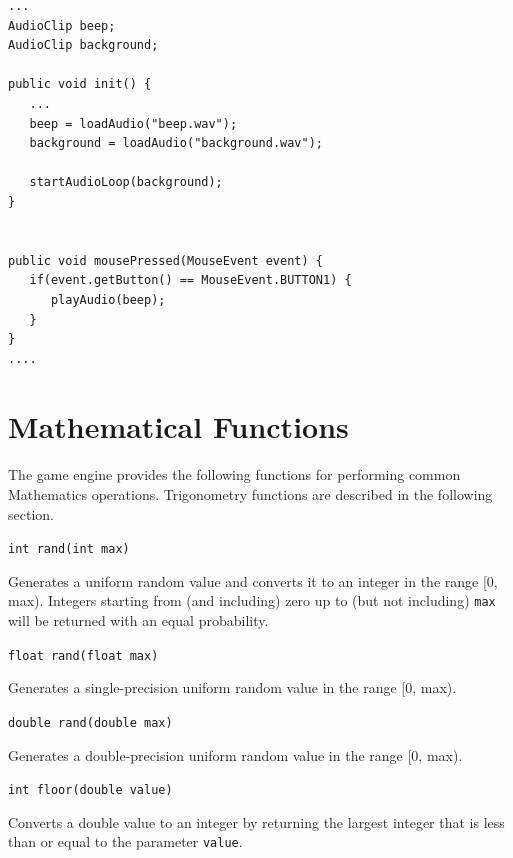 \documentclass[a4paper, 10pt]{report}
\begin{document}
\vspace{1em}
\begin{lstlisting}[caption=Example use game engine audio functions., label=lst:audio]
...
AudioClip beep;
AudioClip background;

public void init() {
   ...
   beep = loadAudio("beep.wav");
   background = loadAudio("background.wav");
   
   startAudioLoop(background);
}


public void mousePressed(MouseEvent event) {
   if(event.getButton() == MouseEvent.BUTTON1) {
      playAudio(beep);
   }
}
....
\end{lstlisting}


\vspace{1em}

\section{Mathematical Functions}

The game engine provides the following functions for performing common Mathematics operations. Trigonometry functions are described in the following section.

\hrulefill

{\large {\tt int rand(int max)}}

Generates a uniform random value and converts it to an integer in the range [0, max). Integers starting from (and including) zero up to (but not including) {\tt max} will be returned with an equal probability.

\hrulefill

{\large {\tt float rand(float max)}}

Generates a single-precision uniform random value in the range [0, max).

\hrulefill

{\large {\tt double rand(double max)}}

Generates a double-precision uniform random value in the range [0, max).

\hrulefill

{\large {\tt int floor(double value)}}

Converts a double value to an integer by returning the largest integer that is less than or equal to the parameter {\tt value}.
\end{document}
